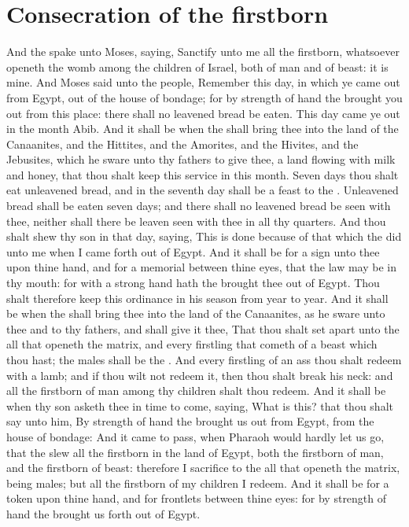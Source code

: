 \section*{Consecration of the firstborn}
\begin{biblechapter} %
\verse And the \LORD spake unto Moses, saying,
\verse Sanctify unto me all the firstborn, whatsoever openeth the womb among the children of Israel, both of man and of beast: it is mine.
\verse And Moses said unto the people, Remember this day, in which ye came out from Egypt, out of the house of bondage; for by strength of hand the \LORD brought you out from this place: there shall no leavened bread be eaten.
\verse This day came ye out in the month Abib.
\verse And it shall be when the \LORD shall bring thee into the land of the Canaanites, and the Hittites, and the Amorites, and the Hivites, and the Jebusites, which he sware unto thy fathers to give thee, a land flowing with milk and honey, that thou shalt keep this service in this month.
\verse Seven days thou shalt eat unleavened bread, and in the seventh day shall be a feast to the \LORD.
\verse Unleavened bread shall be eaten seven days; and there shall no leavened bread be seen with thee, neither shall there be leaven seen with thee in all thy quarters.
\verse And thou shalt shew thy son in that day, saying, This is done because of that which the \LORD did unto me when I came forth out of Egypt.
\verse And it shall be for a sign unto thee upon thine hand, and for a memorial between thine eyes, that the \LORDs law may be in thy mouth: for with a strong hand hath the \LORD brought thee out of Egypt.
\verse Thou shalt therefore keep this ordinance in his season from year to year.
\verse And it shall be when the \LORD shall bring thee into the land of the Canaanites, as he sware unto thee and to thy fathers, and shall give it thee,
\verse That thou shalt set apart unto the \LORD all that openeth the matrix, and every firstling that cometh of a beast which thou hast; the males shall be the \LORDs.
\verse And every firstling of an ass thou shalt redeem with a lamb; and if thou wilt not redeem it, then thou shalt break his neck: and all the firstborn of man among thy children shalt thou redeem.
\verse And it shall be when thy son asketh thee in time to come, saying, What is this? that thou shalt say unto him, By strength of hand the \LORD brought us out from Egypt, from the house of bondage:
\verse And it came to pass, when Pharaoh would hardly let us go, that the \LORD slew all the firstborn in the land of Egypt, both the firstborn of man, and the firstborn of beast: therefore I sacrifice to the \LORD all that openeth the matrix, being males; but all the firstborn of my children I redeem.
\verse And it shall be for a token upon thine hand, and for frontlets between thine eyes: for by strength of hand the \LORD brought us forth out of Egypt.

\end{biblechapter}
